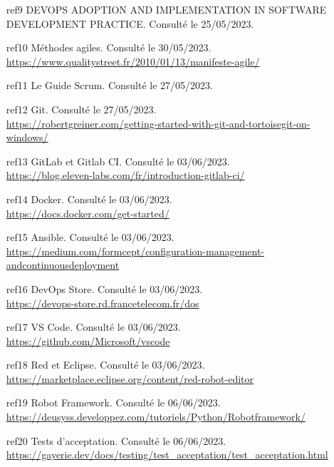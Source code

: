 \begin{enumerate}
\item[ref9] DEVOPS ADOPTION AND IMPLEMENTATION IN SOFTWARE DEVELOPMENT PRACTICE. Consulté le 25/05/2023.

\item[ref10] Méthodes agiles. Consulté le 30/05/2023.\\
\url{https://www.qualitystreet.fr/2010/01/13/manifeste-agile/}

\item[ref11] Le Guide Scrum. Consulté le 27/05/2023.

\item[ref12] Git. Consulté le 27/05/2023.\\
\url{https://robertgreiner.com/getting-started-with-git-and-tortoisegit-on-windows/}

\item[ref13] GitLab et Gitlab CI. Consulté le 03/06/2023.\\
\url{https://blog.eleven-labs.com/fr/introduction-gitlab-ci/}

\item[ref14] Docker. Consulté le 03/06/2023.\\
\url{https://docs.docker.com/get-started/}

\item[ref15] Ansible. Consulté le 03/06/2023.\\
\url{https://medium.com/formcept/configuration-management-andcontinuousdeployment}

\item[ref16] DevOps Store. Consulté le 03/06/2023.\\
\url{https://devops-store.rd.francetelecom.fr/dos}

\item[ref17] VS Code. Consulté le 03/06/2023.\\
\url{https://github.com/Microsoft/vscode}

\item[ref18] Red et Eclipse. Consulté le 03/06/2023.\\
\url{https://marketplace.eclipse.org/content/red-robot-editor}

\item[ref19] Robot Framework. Consulté le 06/06/2023.\\
\url{https://deusyss.developpez.com/tutoriels/Python/Robotframework/}

\item[ref20] Tests d'acceptation. Consulté le 06/06/2023.\\
\url{https://gayerie.dev/docs/testing/test_acceptation/test_acceptation.html}


\end{enumerate}
